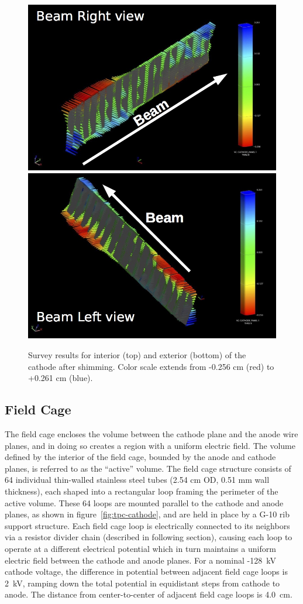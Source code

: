\begin{figure}[htb]
\centering
\includegraphics[width=0.75\linewidth]{figures/cathode_right.jpg}
\includegraphics[width=0.75\linewidth]{figures/cathode_left.jpg}
\caption{Survey results for interior (top) and exterior (bottom) of the cathode after shimming.  Color scale extends from -0.256 cm (red) to +0.261 cm (blue).}
\label{fig:tpc-cathode-survey}
\end{figure}

\subsection{Field Cage}
The field cage encloses the volume between the cathode plane and the anode wire planes, and in doing so creates a region with a uniform electric field.  The volume defined by the interior of the field cage, bounded by the anode and cathode planes, is referred to as the ``active'' volume.   The field cage structure consists of 64 individual thin-walled stainless steel tubes (2.54 cm OD, 0.51 mm wall thickness), each shaped into a rectangular loop framing the perimeter of the active volume. These 64 loops are mounted parallel to the cathode and anode planes, as shown in figure~\ref{fig:tpc-cathode}, and are held in place by a G-10 rib support structure. Each field cage loop is electrically connected to its neighbors via a resistor divider chain (described in following section), causing each loop to operate at a different electrical potential which in turn maintains a uniform electric field between the cathode and anode planes. For a nominal -128~kV cathode voltage, the difference in potential between adjacent field cage loops is 2~kV, ramping down the total potential in equidistant steps from cathode to anode. The distance from center-to-center of adjacent field cage loops is 4.0~cm.

